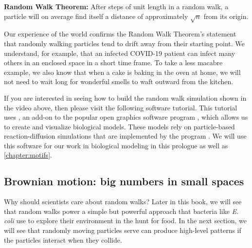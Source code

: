 \textbf{Random Walk Theorem:} After  steps of unit length in a random walk, a particle will on average find itself a distance of approximately $\sqrt{n}$ from its origin.\\

\begin{note}\end{note}

Our experience of the world confirms the Random Walk Theorem's statement that randomly walking particles tend to drift away from their starting point. We understand, for example, that an infected COVID-19 patient can infect many others in an enclosed space in a short time frame. To take a less macabre example, we also know that when a cake is baking in the oven at home, we will not need to wait long for wonderful smells to waft outward from the kitchen.

If you are interested in seeing how to build the random walk simulation shown in the video above, then please visit the following software tutorial. This tutorial uses , an add-on to the popular open graphics software program  , which allows us to create and visualize biological models. These models rely on particle-based reaction-diffusion simulations that are implemented by the program  . We will use this software for our work in biological modeling in this prologue as well as \autoref{chapter:motifs}.

\begin{note}\end{note}


\FloatBarrier
{}
\subsection{Brownian motion: big numbers in small spaces}

Why should scientists care about random walks? Later in this book, we will see that random walks power a simple but powerful approach that bacteria like \textit{E. coli} use to explore their environment in the hunt for food. In the next section, we will see that randomly moving particles serve can produce high-level patterns if the particles interact when they collide.

